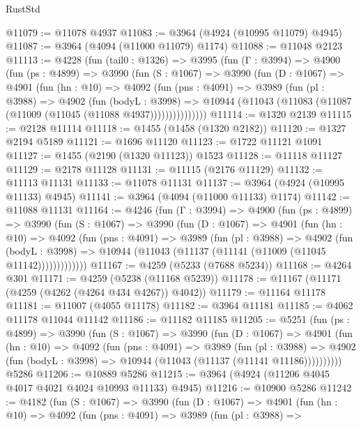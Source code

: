 \begin{lexlean}{RustStd}
\begin{coremodule}
@11079 := @11078 @4937
@11083 := @3964 (@4924 (@10995 @11079) @4945)
@11087 := @3964 (@4094 (@11000 @11079) @1174)
@11088 := @11048 @2123
@11113 := @4228
    (fun (tail0 : @1326) =>
    @3995
      (fun (Γ : @3994) =>
      @4900
        (fun (ps : @4899) =>
        @3990
          (fun (S : @1067) =>
          @3990
            (fun (D : @1067) =>
            @4901
              (fun (hn : @10) =>
              @4092
                (fun (pns : @4091) =>
                @3989
                  (fun (pl : @3988) =>
                  @4902
                    (fun (bodyL : @3998) =>
                    @10944 (@11043 (@11083 (@11087 (@11009 (@11045 (@11088 @4937)))))))))))))))
@11114 := @1320 @2139
@11115 := @2128 @11114
@11118 := @1455 (@1458 (@1320 @2182))
@11120 := @1327 @2194 @5189
@11121 := @1696 @11120
@11123 := @1722 @11121 @1091
@11127 := @1455 (@2190 (@1320 @11123)) @1523
@11128 := @11118 @11127
@11129 := @2178 @11128
@11131 := @11115 (@2176 @11129)
@11132 := @11113 @11131
@11133 := @11078 @11131
@11137 := @3964 (@4924 (@10995 @11133) @4945)
@11141 := @3964 (@4094 (@11000 @11133) @1174)
@11142 := @11088 @11131
@11164 := @4246
    (fun (Γ : @3994) =>
    @4900
      (fun (ps : @4899) =>
      @3990
        (fun (S : @1067) =>
        @3990
          (fun (D : @1067) =>
          @4901
            (fun (hn : @10) =>
            @4092
              (fun (pns : @4091) =>
              @3989
                (fun (pl : @3988) =>
                @4902
                  (fun (bodyL : @3998) =>
                  @10944 (@11043 (@11137 (@11141 (@11009 (@11045 @11142)))))))))))))
@11167 := @4259 (@5233 (@7688 @5234))
@11168 := @4264 @301
@11171 := @4259 (@5238 (@11168 @5239))
@11178 := @11167 (@11171 (@4259 (@4262 (@4264 @434 @4267)) @4042))
@11179 := @11164 @11178
@11181 := @11007 (@4055 @11178)
@11182 := @3964 @11181
@11185 := @4062 @11178 @11044 @11142
@11186 := @11182 @11185
@11205 := @5251
    (fun (ps : @4899) =>
    @3990
      (fun (S : @1067) =>
      @3990
        (fun (D : @1067) =>
        @4901
          (fun (hn : @10) =>
          @4092
            (fun (pns : @4091) =>
            @3989
              (fun (pl : @3988) =>
              @4902 (fun (bodyL : @3998) => @10944 (@11043 (@11137 (@11141 @11186))))))))))
    @5286
@11206 := @10889 @5286
@11215 := @3964 (@4924 (@11206 @4045 @4017 @4021 @4024 @10993 @11133) @4945)
@11216 := @10900 @5286
@11242 := @4182
    (fun (S : @1067) =>
    @3990
      (fun (D : @1067) =>
      @4901
        (fun (hn : @10) =>
        @4092
          (fun (pns : @4091) =>
          @3989
            (fun (pl : @3988) =>

\end{coremodule}
\end{lexlean}
